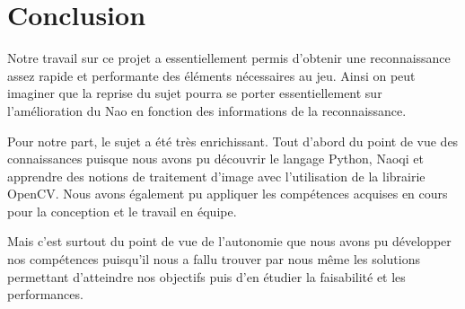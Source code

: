 \section{Conclusion}
\label{sec:Conclusion}
\par Notre travail sur ce projet a essentiellement permis d'obtenir une reconnaissance assez rapide et performante des éléments nécessaires au jeu. Ainsi on peut imaginer que la reprise du sujet pourra se porter essentiellement sur l'amélioration du Nao en fonction des informations de la reconnaissance.
\par Pour notre part, le sujet a été très enrichissant. Tout d'abord du point de vue des connaissances puisque nous avons pu découvrir le langage Python, Naoqi et apprendre des notions de traitement d'image avec l'utilisation de la librairie OpenCV. Nous avons également pu appliquer les compétences acquises en cours pour la conception et le travail en équipe. 
\par Mais c'est surtout du point de vue de l'autonomie que nous avons pu   développer nos compétences puisqu'il nous a fallu trouver par nous même les solutions permettant d'atteindre nos objectifs puis d'en étudier la faisabilité et les performances.


\pagebreak
